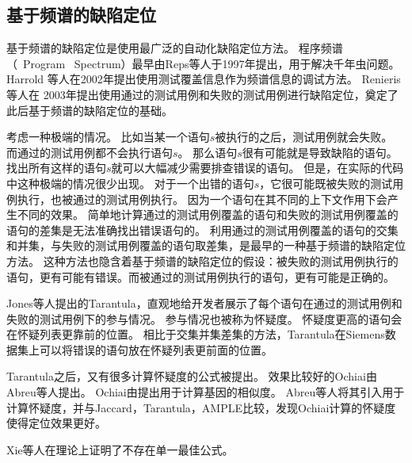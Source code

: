 \subsection{基于频谱的缺陷定位}

基于频谱的缺陷定位是使用最广泛的自动化缺陷定位方法\parencite{YingfeiFL}。
程序频谱（~Program~ Spectrum）最早由Reps等人于1997年提出\parencite{Reps1997The}，用于解决千年虫问题。
Harrold 等人在2002年\parencite{Harrold2000An}提出使用测试覆盖信息作为频谱信息的调试方法。
Renieris等人在 2003年提出使用通过的测试用例和失败的测试用例进行缺陷定位\parencite{Renieres2003Fault}，奠定了此后基于频谱的缺陷定位的基础。

考虑一种极端的情况。
比如当某一个语句$s$被执行的之后，测试用例就会失败。
而通过的测试用例都不会执行语句$s$。
那么语句$s$很有可能就是导致缺陷的语句。
找出所有这样的语句$s$就可以大幅减少需要排查错误的语句。
但是，在实际的代码中这种极端的情况很少出现。
对于一个出错的语句$s$，它很可能既被失败的测试用例执行，也被通过的测试用例执行。
因为一个语句在其不同的上下文作用下会产生不同的效果。
简单地计算通过的测试用例覆盖的语句和失败的测试用例覆盖的语句的差集是无法准确找出错误语句的。
利用通过的测试用例覆盖的语句的交集和并集，与失败的测试用例覆盖的语句取差集，是最早的一种基于频谱的缺陷定位方法\parencite{Renieres2003Fault}。
这种方法也隐含着基于频谱的缺陷定位的假设：被失败的测试用例执行的语句，更有可能有错误。而被通过的测试用例执行的语句，更有可能是正确的。

Jones等人提出的Tarantula\parencite{Jones2002Visualization}，直观地给开发者展示了每个语句在通过的测试用例和失败的测试用例下的参与情况。
参与情况也被称为怀疑度。
怀疑度更高的语句会在怀疑列表更靠前的位置。
相比于交集并集差集的方法，Tarantula在Siemens数据集上可以将错误的语句放在怀疑列表更前面的位置\parencite{Jones2005Empirical}。

Tarantula之后，又有很多计算怀疑度的公式被提出。
效果比较好的Ochiai由Abreu等人提出\parencite{Abreu2006An}。
Ochiai由\parencite{Meyer2004Comparison}提出用于计算基因的相似度。
Abreu等人将其引入用于计算怀疑度，并与Jaccard\parencite{Chen2002Pinpoint}，Tarantula，AMPLE\parencite{Dallmeier2005Lightweight}比较，发现Ochiai计算的怀疑度使得定位效果更好\parencite{Abreu2006An,Abreu2007On}。

Xie等人在理论上证明了不存在单一最佳公式\parencite{Xie2013A}。

